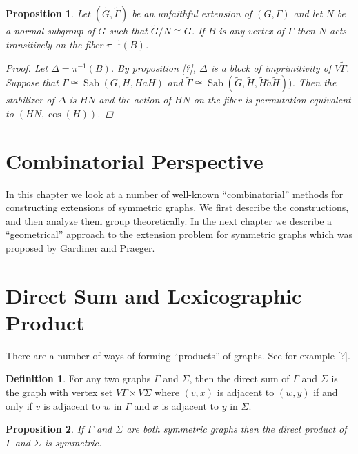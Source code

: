 \documentclass[12pt]{amsart}
\theoremstyle{plain}
\newtheorem{proposition}{Proposition}
\theoremstyle{definition}
\newtheorem{definition}{Definition}
\theoremstyle{remark}
\DeclareMathOperator{\sab}{Sab}
\begin{document}

\begin{proposition}
Let $(\widetilde{G},\widetilde{\Gamma})$ be an unfaithful
extension of $(G, \Gamma)$ and let $N$ be a normal subgroup of 
$\widetilde{G}$
such that $\widetilde{G}/N \cong G$.
If $B$ is any vertex of $\Gamma$ then $N$ acts transitively on
the fiber $\pi^{-1}(B)$.
\begin{proof}
Let $\Delta = \pi^{-1}(B)$.
By proposition [?], $\Delta$ is a block of imprimitivity
of $V \widetilde{\Gamma}$.
Suppose that $\Gamma \cong \sab(G,H,HaH)$ and
$\widetilde{\Gamma} \cong
\sab(\widetilde{G},\widetilde{H},\widetilde{H}\widetilde{a}\widetilde{H}))$.
Then the stabilizer of $\Delta$ is $HN$ and the action
of $HN$ on the fiber is permutation equivalent to $(HN,\cos(H))$.

\end{proof}
\end{proposition}


\newpage

\section{Combinatorial Perspective}



In this chapter we look at a number of well-known
``combinatorial'' methods for constructing
extensions of symmetric graphs. We first describe the constructions,
and then analyze them group theoretically.
In the next chapter we describe a ``geometrical'' approach
to the extension problem for symmetric graphs which was
proposed by Gardiner and Praeger.

\section{Direct Sum and Lexicographic Product}

There are a number of ways of forming ``products''
of graphs. See for example [?].

\begin{definition}
For any two graphs $\Gamma$ and $\Sigma$,
then the direct sum of $\Gamma$ and $\Sigma$
is the graph with vertex set $V \Gamma \times V \Sigma$
where $(v,x)$ is adjacent to $(w,y)$ if and only
if $v$ is adjacent to $w$ in $\Gamma$
and $x$ is adjacent to $y$ in $\Sigma$.
\end{definition}

\begin{proposition}
If $\Gamma$ and $\Sigma$ are both symmetric graphs
then the direct product of $\Gamma$ and $\Sigma$
is symmetric.
\end{proposition}
\end{document}
